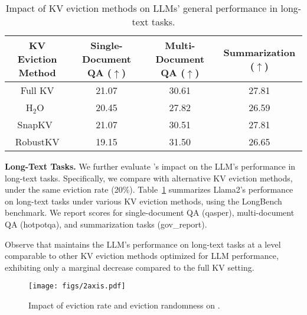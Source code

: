 \begin{table}[!ht]
\renewcommand{\arraystretch}{1.1}
\small
\centering
\begin{tabular}{ c|c|c|c } 
KV Eviction Method & Single-Document QA ($\uparrow$) & Multi-Document QA ($\uparrow$) & Summarization ($\uparrow$) \\
\hline 
Full KV & 21.07 & 30.61 & 27.81\\ 
H$_2$O~\citep{h2o} & 20.45 & 27.82 & 26.59\\ 
SnapKV~\citep{snapkv} & 21.07 & 30.51 & 27.81\\ 
RobustKV & 19.15 & 31.50 & 26.65\\ 
\end{tabular}
\caption{Impact of KV eviction methods on LLMs' general performance in long-text tasks.\label{tab:2}}
\end{table}

{\bf Long-Text Tasks.} We further evaluate \rkv's impact on the LLM's performance in long-text tasks. Specifically, we compare \rkv with alternative KV eviction methods, under the same eviction rate (20\%).
Table~\ref{tab:2} summarizes Llama2's performance on long-text tasks under various KV eviction methods, using the LongBench benchmark. We report scores for single-document QA (qasper), multi-document QA (hotpotqa), and summarization tasks (gov\_report). %

Observe that \rkv maintains the LLM's performance on long-text tasks at a level comparable to other KV eviction methods optimized for LLM performance, exhibiting only a marginal decrease compared to the full KV setting.




\begin{figure}[!th]
    \centering
    \texttt{[image: figs/2axis.pdf]}
    \caption{Impact of eviction rate and eviction randomness on \rkv.}
    \label{fig:ablation}
\end{figure}


